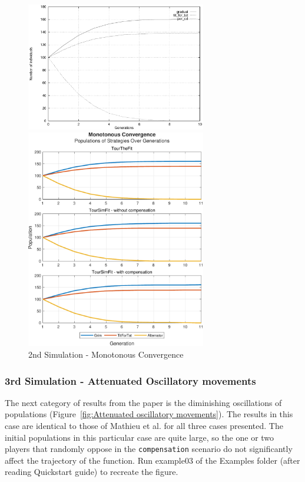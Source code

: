 \documentclass[12pt]{article}
\begin{document}
	\begin{figure}[h]
	      \centering
		  \includegraphics[width=0.7\textwidth]{RefPaperFigures/fig2.jpeg}\par\vspace{0.5em}
	      \includegraphics[width=0.7\textwidth]{Monotonous Convergence.pdf}
	      \caption{2nd Simulation - Monotonous Convergence}
	      \label{fig:Monotonous Convergence}
	\end{figure}
\subsubsection{3rd Simulation - Attenuated Oscillatory movements}
The next category of results from the paper is the diminishing oscillations of populations (Figure~\ref{fig:Attenuated oscillatory movements}). The results in this case are identical to those of Mathieu et al. for all three cases presented. The initial populations in this particular case are quite large, so the one or two players that randomly oppose in the \texttt{compensation} scenario do not significantly affect the trajectory of the function. Run example03 of the Examples folder (after reading Quickstart guide) to recreate the figure.
\end{document}
